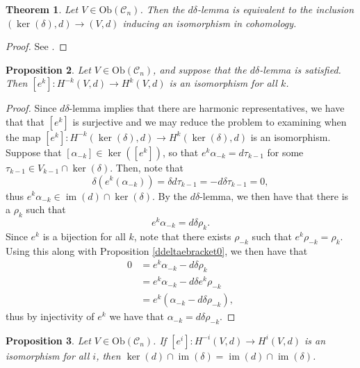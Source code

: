 \documentclass{amsart}
\newcommand{\ra}{\rightarrow}
\newtheorem{theorem}{Theorem}
\newtheorem{prop}[theorem]{Proposition}
\theoremstyle{definition}
\DeclareMathOperator{\im}{im}
\begin{document}
\begin{theorem}\label{ddeltaequivrep}
    Let $V \in \mathrm{Ob}(\mathscr{C}_n)$. Then
    the $d\delta$-lemma is equivalent to the inclusion $(\ker(\delta),d) \ra (V, d)$ inducing an isomorphism in cohomology.
\end{theorem}
\begin{proof}
    See \cite[Lemma 5.4.1]{manin1998constructions}.
\end{proof}
\begin{prop}\label{ddeltaimpSLP}
    Let $V \in \mathrm{Ob}(\mathscr{C}_n)$, and suppose that the $d\delta$-lemma is satisfied. Then $[e^k]:H^{-k}(V,d) \ra H^k(V,d)$ is an isomorphism for all $k$.
\end{prop}
\begin{proof}
    Since $d\delta$-lemma implies that there are harmonic representatives, we have that that $[e^k]$ is surjective and we may reduce the problem to examining when the map $[e^k]:H^{-k}(\ker(\delta),d) \ra H^k(\ker(\delta),d)$ is an isomorphism. Suppose that $[\alpha_{-k}] \in \ker([e^k])$, so that $e^k\alpha_{-k}=d\tau_{k-1}$ for some $\tau_{k-1}\in V_{k-1} \cap \ker(\delta)$. Then, note that
    \begin{equation*}
        \delta(e^k(\alpha_{-k}))=\delta d \tau_{k-1}=-d\delta \tau_{k-1}=0,
    \end{equation*}
     thus $e^k\alpha_{-k} \in \im(d) \cap \ker(\delta)$. By the $d \delta$-lemma, we then have that there is a $\rho_k$ such that
    \begin{equation*}
        e^k\alpha_{-k} = d \delta \rho_k.
    \end{equation*}
    Since $e^k$ is a bijection for all $k$, note that there exists $\rho_{-k}$ such that $e^k\rho_{-k}=\rho_k$. Using this along with Proposition \ref{ddeltaebracket0},  we then have that
    \begin{align*}
        0 &= e^{k}\alpha_{-k} - d\delta \rho_k \\
         &=e^{k}\alpha_{-k} - d\delta e^k \rho_{-k} \\
         &= e^k(\alpha_{-k}-d\delta \rho_{-k}),
    \end{align*}
    thus by injectivity of $e^k$ we have that $\alpha_{-k}=d\delta \rho_{-k}$.
\end{proof}
\begin{prop}\label{KIisII}
    Let $V \in \mathrm{Ob}(\mathscr{C}_n)$. If $[e^i]:H^{-i}(V,d) \ra H^i(V,d)$ is an isomorphism for all $i$, then $\ker(d) \cap \im (\delta) = \im(d) \cap \im(\delta)$.
\end{prop}
\end{document}
